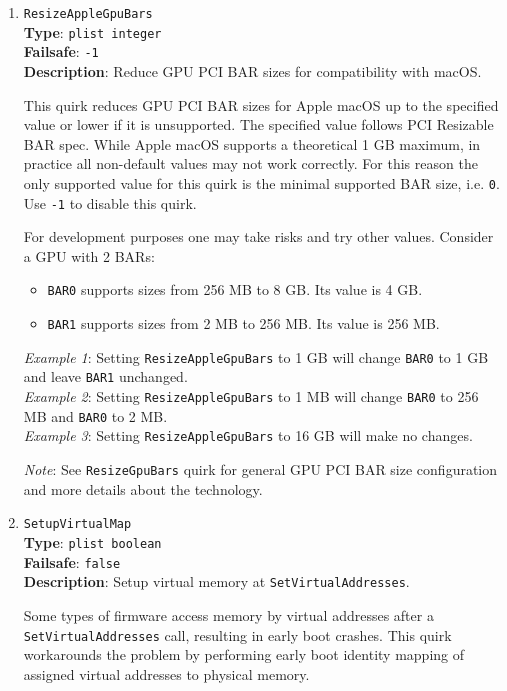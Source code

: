 \documentclass[]{article}
\providecommand{\tightlist}{%
  \setlength{\itemsep}{0pt}\setlength{\parskip}{0pt}}
\begin{document}
\begin{enumerate}
\item
  \texttt{ResizeAppleGpuBars}\\
  \textbf{Type}: \texttt{plist\ integer}\\
  \textbf{Failsafe}: \texttt{-1}\\
  \textbf{Description}: Reduce GPU PCI BAR sizes for compatibility with macOS.

  This quirk reduces GPU PCI BAR sizes for Apple macOS up to the specified
  value or lower if it is unsupported. The specified value follows PCI Resizable
  BAR spec. While Apple macOS supports a theoretical 1 GB maximum, in practice all
  non-default values may not work correctly. For this reason the only supported
  value for this quirk is the minimal supported BAR size, i.e. \texttt{0}. Use
  \texttt{-1} to disable this quirk.

  For development purposes one may take risks and try other values.
  Consider a GPU with 2 BARs:
  \begin{itemize}
    \tightlist
    \item \texttt{BAR0} supports sizes from 256 MB to 8 GB. Its value is 4 GB.
    \item \texttt{BAR1} supports sizes from 2 MB to 256 MB. Its value is 256 MB.
  \end{itemize}

  \emph{Example 1}: Setting \texttt{ResizeAppleGpuBars} to 1 GB will change
  \texttt{BAR0} to 1 GB and leave \texttt{BAR1} unchanged.
  \\
  \emph{Example 2}: Setting \texttt{ResizeAppleGpuBars} to 1 MB will change
  \texttt{BAR0} to 256 MB and \texttt{BAR0} to 2 MB.
  \\
  \emph{Example 3}: Setting \texttt{ResizeAppleGpuBars} to 16 GB will make no
  changes.

  \emph{Note}: See \texttt{ResizeGpuBars} quirk for general GPU PCI BAR
  size configuration and more details about the technology.

\item
  \texttt{SetupVirtualMap}\\
  \textbf{Type}: \texttt{plist\ boolean}\\
  \textbf{Failsafe}: \texttt{false}\\
  \textbf{Description}: Setup virtual memory at \texttt{SetVirtualAddresses}.

  Some types of firmware access memory by virtual addresses after a \texttt{SetVirtualAddresses}
  call, resulting in early boot crashes. This quirk workarounds the problem by
  performing early boot identity mapping of assigned virtual addresses to physical
  memory.


\end{enumerate}
\end{document}
